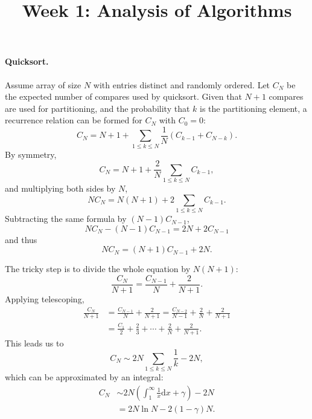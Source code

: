 \documentclass{article}
\begin{document}
\title{Week 1: Analysis of Algorithms}
\maketitle

\paragraph{Quicksort.} Assume array of size $N$ with entries distinct and
randomly ordered. Let $C_N$ be the expected number of compares used by
quicksort. Given that $N + 1$ compares are used for partitioning, and the
probability that $k$ is the partitioning element, a recurrence relation can
be formed for $C_N$ with $C_0 = 0$: \begin{equation*}
  C_N = N + 1 + \sum_{1 \leq k \leq N}\frac{1}{N}(C_{k - 1} + C_{N - k}).
\end{equation*} By symmetry, \begin{equation*}
  C_N = N + 1 + \frac{2}{N}\sum_{1 \leq k \leq N}C_{k - 1},
\end{equation*} and multiplying both sides by $N$, \begin{equation*}
  NC_N = N(N + 1) + 2\sum_{1 \leq k \leq N}C_{k - 1}.
\end{equation*} Subtracting the same formula by $(N - 1)C_{N - 1}$,
\begin{equation*}
  NC_N - (N - 1)C_{N - 1} = 2N + 2C_{N - 1}
\end{equation*} and thus \begin{equation*}
  NC_N = (N + 1)C_{N - 1} + 2N.
\end{equation*}

The tricky step is to divide the whole equation by $N(N + 1)$:
\begin{equation*}
  \frac{C_N}{N + 1} = \frac{C_{N - 1}}{N} + \frac{2}{N + 1}.
\end{equation*} Applying telescoping, \begin{align*}
  \frac{C_N}{N + 1} &= \frac{C_{N - 1}}{N} + \frac{2}{N + 1} =
    \frac{C_{N - 2}}{N - 1} + \frac{2}{N} + \frac{2}{N + 1} \\
    &= \frac{C_1}{2} + \frac{2}{3} + \cdots + \frac{2}{N} + \frac{2}{N + 1}.
\end{align*} This leads us to \begin{equation*}
  C_N \sim 2N\sum_{1 \leq k \leq N}\frac{1}{k} - 2N,
\end{equation*} which can be approximated by an integral: \begin{align*}
  C_N &\sim 2N\left(\int^{\infty}_1 \frac{1}{x} \mathrm{d}x + \gamma\right)
    - 2N \\
    &= 2N\ln{N} - 2(1 - \gamma)N.
\end{align*}
\end{document}
